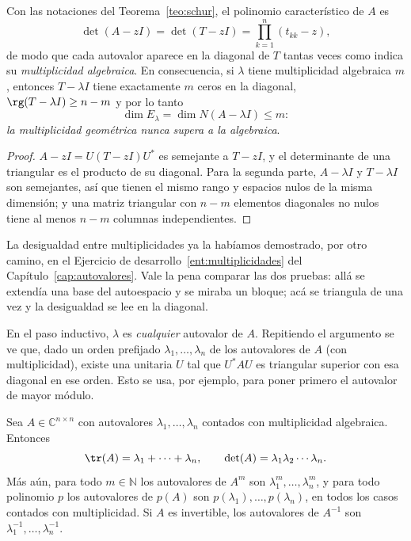 \begin{corollary}\label{cor:mult-diagonal}
Con las notaciones del Teorema~\ref{teo:schur}, el polinomio característico de $A$ es
\[
\det(A-zI)=\det(T-zI)=\prod_{k=1}^{n}(t_{kk}-z),
\]
de modo que cada autovalor aparece en la diagonal de $T$ tantas veces como indica su
\emph{multiplicidad algebraica}. En consecuencia, si $\lambda$ tiene multiplicidad
algebraica $m$, entonces $T-\lambda I$ tiene exactamente $m$ ceros en la diagonal,
$\rg(T-\lambda I)\ge n-m$ y por lo tanto
\[
\dim E_\lambda=\dim N(A-\lambda I)\le m :
\]
\emph{la multiplicidad geométrica nunca supera a la algebraica}.
\end{corollary}

\begin{proof}
$A-zI=U(T-zI)U^{*}$ es semejante a $T-zI$, y el determinante de una triangular es el
producto de su diagonal. Para la segunda parte, $A-\lambda I$ y $T-\lambda I$ son
semejantes, así que tienen el mismo rango y espacios nulos de la misma dimensión; y una
matriz triangular con $n-m$ elementos diagonales no nulos tiene al menos $n-m$ columnas
independientes.
\end{proof}

\begin{remark}
La desigualdad entre multiplicidades ya la habíamos demostrado, por otro camino, en el
Ejercicio de desarrollo~\ref{ent:multiplicidades} del
Capítulo~\ref{cap:autovalores}. Vale la pena comparar las dos pruebas: allá se extendía
una base del autoespacio y se miraba un bloque; acá se triangula de una vez y la
desigualdad se lee en la diagonal.
\end{remark}

\begin{remark}  %
En el paso inductivo, $\lambda$ es \emph{cualquier} autovalor de $A$. Repitiendo el argumento
se ve que, dado un orden prefijado $\lambda_1,\dots,\lambda_n$ de los autovalores de $A$
(con multiplicidad), existe una unitaria $U$ tal que $U^{*}AU$ es triangular superior
con esa diagonal en ese orden. Esto se usa, por ejemplo, para poner primero el autovalor
de mayor módulo.
\end{remark}

\begin{corollary}
\label{cor:traza-det}
Sea $A\in\mathbb{C}^{n\times n}$ con autovalores $\lambda_1,\dots,\lambda_n$ contados
con multiplicidad algebraica. Entonces
\[
\tr(A)=\lambda_1+\cdots+\lambda_n,
\qquad
\det(A)=\lambda_1\lambda_2\cdots\lambda_n .
\]
Más aún, para todo $m\in\mathbb{N}$ los autovalores de $A^{m}$ son
$\lambda_1^{m},\dots,\lambda_n^{m}$, y para todo polinomio $p$ los autovalores de
$p(A)$ son $p(\lambda_1),\dots,p(\lambda_n)$, en todos los casos contados con
multiplicidad. Si $A$ es invertible, los autovalores de $A^{-1}$ son
$\lambda_1^{-1},\dots,\lambda_n^{-1}$.
\end{corollary}

